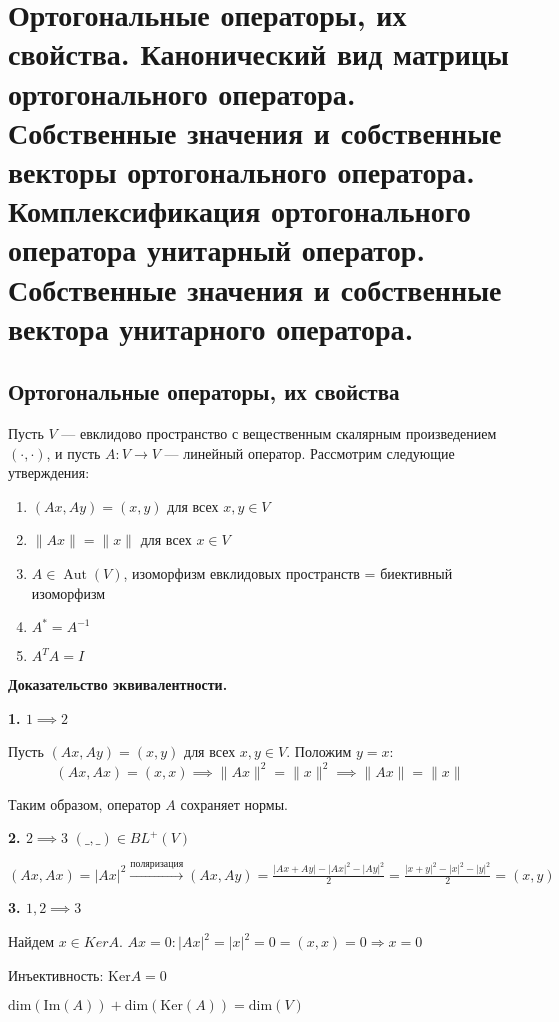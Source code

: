 \documentclass[12pt]{article}
\begin{document}
\section{Ортогональные операторы, их свойства. Канонический вид матрицы ортогонального оператора.
 Собственные значения и собственные векторы ортогонального оператора. Комплексификация
 ортогонального оператора унитарный оператор. Собственные значения и собственные вектора
 унитарного оператора.}

\subsection{Ортогональные операторы, их свойства}

Пусть $ V $ — евклидово пространство с вещественным скалярным произведением $ (\cdot, \cdot) $, и пусть $ A: V \to V $ — линейный оператор. Рассмотрим следующие утверждения:

\begin{enumerate}
    \item $ (Ax, Ay) = (x, y) $ для всех $ x, y \in V $
    \item $ \|Ax\| = \|x\| $ для всех $ x \in V $
    \item $ A \in \operatorname{Aut}(V) $, изоморфизм евклидовых пространств = биективный изоморфизм
    \item $ A^* = A^{-1} $
    \item $ A^T A = I $
\end{enumerate}

\textbf{Доказательство эквивалентности.}

\textbf{1. $ 1 \implies 2 $}

Пусть $ (Ax, Ay) = (x, y) $ для всех $ x, y \in V $. Положим $ y = x $:
$$
(Ax, Ax) = (x, x)
\implies \|Ax\|^2 = \|x\|^2
\implies \|Ax\| = \|x\|
$$

Таким образом, оператор $ A $ сохраняет нормы.

\textbf{2. $ 2 \implies 3 $}
$(\_,\_) \in BL^+(V)$

$(Ax,Ax) = |Ax|^2 \xrightarrow{поляризация} (Ax, Ay) = \frac{|Ax + Ay| - |Ax|^2 - |Ay|^2}{2} = \frac{|x+y|^2 - |x|^2 - |y|^2}{2} = (x,y)$

\textbf{3. $ 1, 2\implies 3 $}

Найдем $x \in KerA$.
$Ax = 0 : |Ax|^2 = |x|^2 = 0 = (x,x) =0 \Rightarrow x = 0$

Инъективность: $\mathrm{Ker}A = {0}$

$\mathrm{dim}(\mathrm{Im}(A)) + \mathrm{dim}(\mathrm{Ker}(A)) = \mathrm{dim}(V)$
\end{document}
